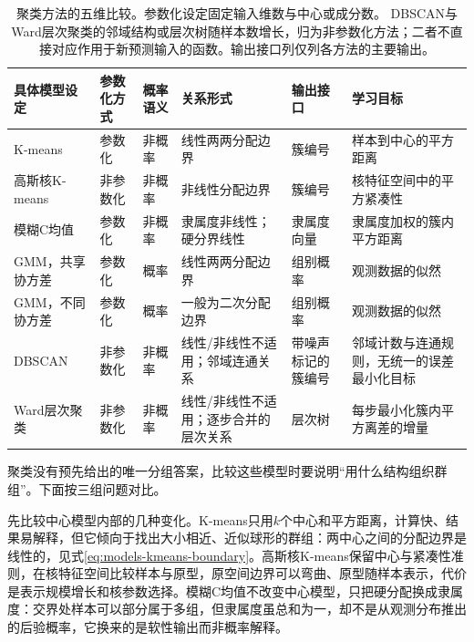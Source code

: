 \begin{table}[htbp]
  \centering
  \footnotesize
  \setlength{\tabcolsep}{4pt}
  \renewcommand{\arraystretch}{1.25}
  \begin{tabularx}{\linewidth}{@{}>{\raggedright\arraybackslash}p{28mm}>{\raggedright\arraybackslash}p{20mm}>{\raggedright\arraybackslash}p{14mm}>{\raggedright\arraybackslash}p{22mm}>{\raggedright\arraybackslash}p{20mm}>{\raggedright\arraybackslash}X@{}}
    \toprule
    \textbf{具体模型设定} & \textbf{参数化方式} & \textbf{概率语义} & \textbf{关系形式} & \textbf{输出接口} & \textbf{学习目标} \\
    \midrule
    K-means & 参数化 & 非概率 & 线性两两分配边界 & 簇编号 & 样本到中心的平方距离 \\
    高斯核K-means & 非参数化 & 非概率 & 非线性分配边界 & 簇编号 & 核特征空间中的平方紧凑性 \\
    模糊C均值 & 参数化 & 非概率 & 隶属度非线性；硬分界线性 & 隶属度向量 & 隶属度加权的簇内平方距离 \\
    GMM，共享协方差 & 参数化 & 概率 & 线性两两分配边界 & 组别概率 & 观测数据的似然 \\
    GMM，不同协方差 & 参数化 & 概率 & 一般为二次分配边界 & 组别概率 & 观测数据的似然 \\
    DBSCAN & 非参数化 & 非概率 & 线性/非线性不适用；邻域连通关系 & 带噪声标记的簇编号 & 邻域计数与连通规则，无统一的误差最小化目标 \\
    Ward层次聚类 & 非参数化 & 非概率 & 线性/非线性不适用；逐步合并的层次关系 & 层次树 & 每步最小化簇内平方离差的增量 \\
    \bottomrule
  \end{tabularx}
  \caption{聚类方法的五维比较。参数化设定固定输入维数与中心或成分数。
  DBSCAN与Ward层次聚类的邻域结构或层次树随样本数增长，归为非参数化方法；二者不直接对应作用于新预测输入的函数。输出接口列仅列各方法的主要输出。}
  \label{tab:models-clusterers}
\end{table}

聚类没有预先给出的唯一分组答案，比较这些模型时要说明“用什么结构组织群组”。下面按三组问题对比。

先比较中心模型内部的几种变化。K-means只用$k$个中心和平方距离，计算快、结果易解释，但它倾向于找出大小相近、近似球形的群组：两中心之间的分配边界是线性的，见式\eqref{eq:models-kmeans-boundary}。高斯核K-means保留中心与紧凑性准则，在核特征空间比较样本与原型，原空间边界可以弯曲、原型随样本表示，代价是表示规模增长和核参数选择。模糊C均值不改变中心模型，只把硬分配换成隶属度：交界处样本可以部分属于多组，但隶属度虽总和为一，却不是从观测分布推出的后验概率，它换来的是软性输出而非概率解释。


